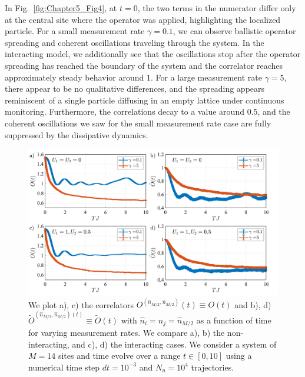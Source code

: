 In Fig.~\ref{fig:Chapter5_Fig4}, at $t=0$, the two terms in the numerator differ only at the central site where the operator was applied, highlighting the localized particle. For a small measurement rate $\gamma = 0.1$, we can observe ballistic operator spreading and coherent oscillations traveling through the system. In the interacting model, we additionally see that the oscillations stop after the operator spreading has reached the boundary of the system and the correlator reaches approximately steady behavior around $1$. For a large measurement rate $\gamma = 5$, there appear to be no qualitative differences, and the spreading appears reminiscent of a single particle diffusing in an empty lattice under continuous monitoring. Furthermore, the correlations decay to a value around $0.5$, and the coherent oscillations we saw for the small measurement rate case are fully suppressed by the dissipative dynamics. 

\begin{figure}[ht]
    \centering
    \includegraphics[width=\textwidth]{Chapters/Plots/Chapter6/Chapter5_Fig5.pdf}
    \caption{We plot a), c) the correlators $O^{(\hat{n}_{M/2},\hat{n}_{M/2})}(t) \equiv O(t)$ and b), d) $\tilde{O}^{(\hat{n}_{M/2},\hat{n}_{M/2})(t)} \equiv \tilde{O}(t)$ with $\hat{n}_i = \hat{n}_j = \hat{n}_{M/2}$ as a function of time for varying measurement rates. We compare a), b) the non-interacting, and c), d) the interacting cases. We consider a system of $M=14$ sites and time evolve over a range $t \in [0, 10]$ using a numerical time step $dt = 10^{-3}$ and $N_u = 10^4$ trajectories.}
    \label{fig:Chapter5_Fig5}
\end{figure}


